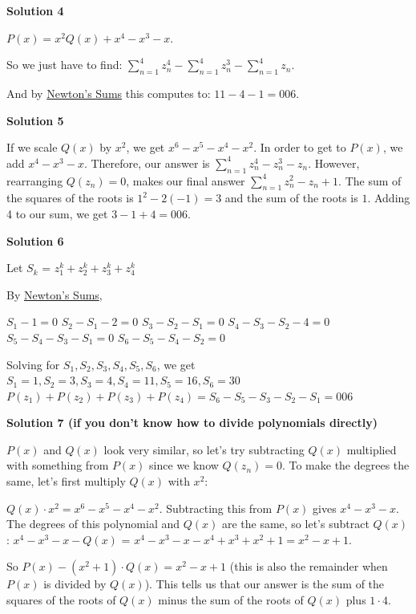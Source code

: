 \begin{enumerate}
 



\textbf{Solution 4}

$P(x) = x^{2}Q(x)+x^{4}-x^{3}-x.$

 So we just have to find: $\sum_{n=1}^{4} z^{4}_n - \sum_{n=1}^{4} z^{3}_n - \sum_{n=1}^{4} z_n$.

 And by \href{https://artofproblemsolving.com/wiki/index.php?title=Newton\%27s\_Sums}{Newton's Sums} this computes to: $11-4-1 = \boxed{006}$.

 



\textbf{Solution 5}

If we scale $Q(x)$ by $x^2$, we get $x^6-x^5-x^4-x^2$. In order to get to $P(x)$, we add $x^4-x^3-x$. Therefore, our answer is $\sum_{n=1}^{4} z^4_n-z^3_n-z_n$. However, rearranging $Q(z_n) = 0$, makes our final answer $\sum_{n=1}^{4} z^2_n-z_n+1$. The sum of the squares of the roots is $1^2-2(-1) = 3$ and the sum of the roots is $1$. Adding 4 to our sum, we get $3-1+4 = \boxed{006}$.

 



\textbf{Solution 6}

Let $S_k$ = $z_1^k+z_2^k+z_3^k+z_4^k$

 By \href{https://artofproblemsolving.com/wiki/index.php?title=Newton\%27s\_Sums}{Newton's Sums},

 $S_1-1=0$
$S_2-S_1-2=0$
$S_3-S_2-S_1=0$
$S_4-S_3-S_2-4=0$
$S_5-S_4-S_3-S_1=0$
$S_6-S_5-S_4-S_2=0$

 Solving for $S_1,S_2,S_3,S_4,S_5,S_6$, we get $S_1=1, S_2=3, S_3=4, S_4=11, S_5=16, S_6=30$
$P(z_1)+P(z_2)+P(z_3)+P(z_4)=S_6-S_5-S_3-S_2-S_1=\boxed{006}$




\textbf{Solution 7 (if you don't know how to divide polynomials directly)}

$P(x)$ and $Q(x)$  look very similar, so let's try subtracting $Q(x)$ multiplied with something from $P(x)$ since we know $Q(z_n) = 0$. To make the degrees the same, let's first multiply $Q(x)$ with $x^2$: 

 $Q(x) \cdot x^2 = x^6 - x^5 - x^4 - x^2$. Subtracting this from $P(x)$ gives $x^4 - x^3 - x$. The degrees of this polynomial and $Q(x)$ are the same, so let's subtract $Q(x)$: $x^4 - x^3 - x - Q(x)$ = $x^4 - x^3 - x - x^4 + x^3 + x^2 + 1 = x^2 - x + 1.$

 So $P(x) - (x^2 + 1) \cdot Q(x) = x^2 - x + 1$ (this is also the remainder when $P(x)$ is divided by $Q(x)$). This tells us that our answer is the sum of the squares of the roots of $Q(x)$ minus the sum of the roots of $Q(x)$ plus $1 \cdot 4$.  


\end{enumerate}
